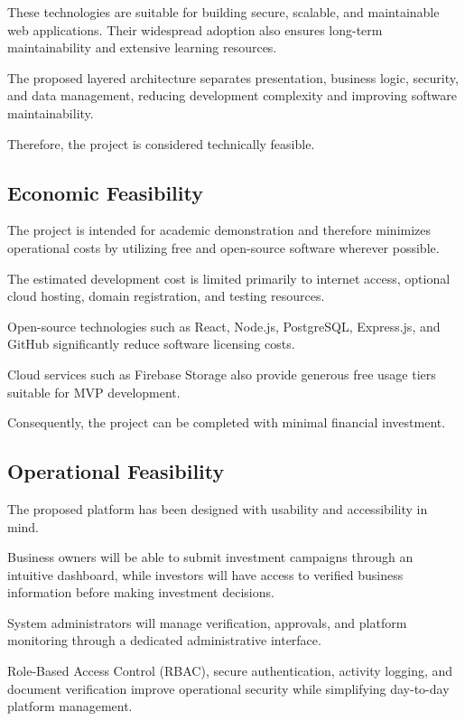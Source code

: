These technologies are suitable for building secure, scalable, and maintainable web applications. Their widespread adoption also ensures long-term maintainability and extensive learning resources.

The proposed layered architecture separates presentation, business logic, security, and data management, reducing development complexity and improving software maintainability.

Therefore, the project is considered technically feasible.


\subsection{Economic Feasibility}

The project is intended for academic demonstration and therefore minimizes operational costs by utilizing free and open-source software wherever possible.

The estimated development cost is limited primarily to internet access, optional cloud hosting, domain registration, and testing resources.

Open-source technologies such as React, Node.js, PostgreSQL, Express.js, and GitHub significantly reduce software licensing costs.

Cloud services such as Firebase Storage also provide generous free usage tiers suitable for MVP development.

Consequently, the project can be completed with minimal financial investment.


\subsection{Operational Feasibility}

The proposed platform has been designed with usability and accessibility in mind.

Business owners will be able to submit investment campaigns through an intuitive dashboard, while investors will have access to verified business information before making investment decisions.

System administrators will manage verification, approvals, and platform monitoring through a dedicated administrative interface.

Role-Based Access Control (RBAC), secure authentication, activity logging, and document verification improve operational security while simplifying day-to-day platform management.


